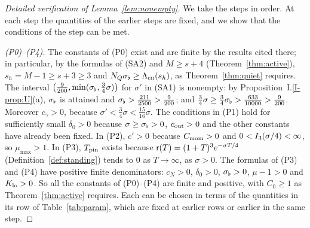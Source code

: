 \begin{proof}[Detailed verification of Lemma~\ref{lem:nonempty}]
We take the steps in order. At each step the quantities of the earlier steps are
fixed, and we show that the conditions of the step can be met.

\emph{(P0)--(P4).} The constants of (P0) exist and are finite by the results
cited there; in particular, by the formulas of (SA2) and $M\ge s+4$
(Theorem~\ref{thm:active}), $s_h=M-1\ge s+3\ge3$ and $N_Q\sigma_\flat\ge\Lambda_{\mathrm{en}}(s_h)$, as
Theorem~\ref{thm:quiet} requires. The interval $\big(\frac9{200},\min(\sigma_\flat,\frac34\sigma)\big)$ for $\sigma'$
in (SA1) is nonempty: by Proposition~I.\ref{I-prop:U}\textup{(a)}, $\sigma_\flat$ is attained and
$\sigma_\flat>\frac{211}{2500}>\frac9{200}$; and
$\frac34\sigma\ge\frac34\sigma_\flat>\frac{633}{10000}>\frac9{200}$. Moreover
$c_\gamma>0$, because $\sigma'<\frac34\sigma<\frac{15}{16}\sigma$. The conditions in (P1) hold for sufficiently small $\delta_0>0$ because
$\sigma\ge\sigma_\flat>0$, $c_{\mathrm{out}}>0$ and the other constants have already been fixed.
In (P2), $c'>0$ because $C_{\mathrm{mom}}>0$ and $0<I_{3}(\sigma/4)<\infty$, so
$\mu_{\max}>1$. In (P3), $T_{\mathrm{pin}}$ exists because $\mathsf{r}(T)=(1+T)^3e^{-\sigma T/4}$
(Definition~\ref{def:standing}) tends to $0$ as $T\to\infty$, as $\sigma>0$. The formulas of (P3) and (P4) have positive finite denominators:
$c_N>0$, $\delta_0>0$, $\sigma_\flat>0$, $\mu-1>0$ and $K_{\mathrm{lo}}>0$. So all the
constants of (P0)--(P4) are finite and positive, with $C_0\ge1$ as
Theorem~\ref{thm:active} requires.
Each can be chosen in terms of the quantities in its row of Table~\ref{tab:param}, which are fixed at
earlier rows or earlier in the same step.


\end{proof}
